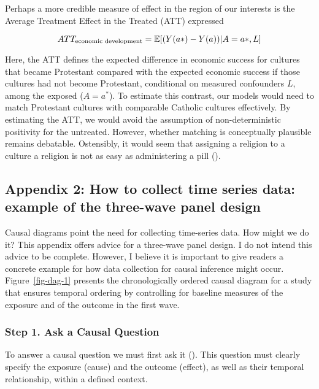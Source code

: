 \documentclass[
  singlecolumn,
  9pt]{article}
\begin{document}
Perhaps a more credible measure of effect in the region of our interests
is the Average Treatment Effect in the Treated (ATT) expressed

\[ATT_{\textnormal{economic~development}} = \mathbb{E}[(Y(a*)- Y(a))|A = a*,L]\]

Here, the ATT defines the expected difference in economic success for
cultures that became Protestant compared with the expected economic
success if those cultures had not become Protestant, conditional on
measured confounders \(L\), among the exposed (\(A = a^*\)). To estimate
this contrast, our models would need to match Protestant cultures with
comparable Catholic cultures effectively. By estimating the ATT, we
would avoid the assumption of non-deterministic positivity for the
untreated. However, whether matching is conceptually plausible remains
debatable. Ostensibly, it would seem that assigning a religion to a
culture a religion is not as easy as administering a pill
().

\subsection{Appendix 2: How to collect time series data: example of the
three-wave panel
design}\label{appendix-2-how-to-collect-time-series-data-example-of-the-three-wave-panel-design}

Causal diagrams point the need for collecting time-series data. How
might we do it? This appendix offers advice for a three-wave panel
design. I do not intend this advice to be complete. However, I believe
it is important to give readers a concrete example for how data
collection for causal inference might occur. Figure~\ref{fig-dag-1}
presents the chronologically ordered causal diagram for a study that
ensures temporal ordering by controlling for baseline measures of the
exposure and of the outcome in the first wave.

\subsubsection{Step 1. Ask a Causal
Question}\label{step-1.-ask-a-causal-question}

To answer a causal question we must first ask it
(). This question
must clearly specify the exposure (cause) and the outcome (effect), as
well as their temporal relationship, within a defined context.
\end{document}
